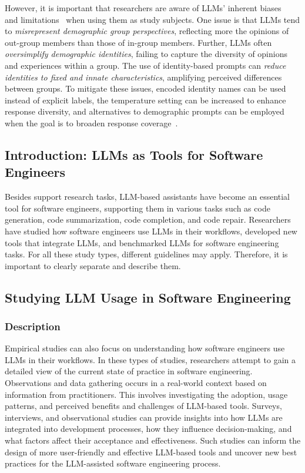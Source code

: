 \documentclass[11pt]{article}
\begin{document}
However, it is important that researchers are aware of LLMs' inherent biases~\cite{Crowell2023} and limitations~\cite{DBLP:journals/ais/HardingDLL24, DBLP:journals/corr/abs-2402-01908} when using them as study subjects.
One issue is that LLMs tend to \emph{misrepresent demographic group perspectives}, reflecting more the opinions of out-group members than those of in-group members.
Further, LLMs often \emph{oversimplify demographic identities}, failing to capture the diversity of opinions and experiences within a group.
The use of identity-based prompts can \emph{reduce identities to fixed and innate characteristics}, amplifying perceived differences between groups.
To mitigate these issues, encoded identity names can be used instead of explicit labels, the temperature setting can be increased to enhance response diversity, and alternatives to demographic prompts can be employed when the goal is to broaden response coverage~\cite{DBLP:journals/ais/HardingDLL24, DBLP:journals/corr/abs-2402-01908}.


\subsection{Introduction: LLMs as Tools for Software Engineers}

Besides support research tasks, LLM-based assistants have become an essential tool for software engineers, supporting them in various tasks such as code generation, code summarization, code completion, and code repair.
Researchers have studied how software engineers use LLMs in their workflows, developed new tools that integrate LLMs, and benchmarked LLMs for software engineering tasks.
For all these study types, different guidelines may apply.
Therefore, it is important to clearly separate and describe them. 

\subsection{Studying LLM Usage in Software Engineering}

\subsubsection{Description}

Empirical studies can also focus on understanding how software engineers use LLMs in their workflows.
In these types of studies, researchers attempt to gain a detailed view of the current state of practice in software engineering.
Observations and data gathering occurs in a real-world context based on information from practitioners.
This involves investigating the adoption, usage patterns, and perceived benefits and challenges of LLM-based tools. 
Surveys, interviews, and observational studies can provide insights into how LLMs are integrated into development processes, how they influence decision-making, and what factors affect their acceptance and effectiveness. 
Such studies can inform the design of more user-friendly and effective LLM-based tools and uncover new best practices for the LLM-assisted software engineering process.
\end{document}
